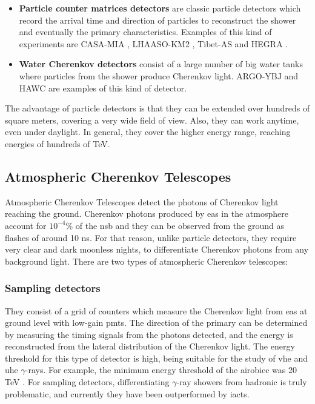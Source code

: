\documentclass[main.tex]{subfiles}
\begin{document}
\begin{itemize}
\item \textbf{Particle counter matrices detectors} are classic particle detectors which record the arrival time and direction of particles to reconstruct the shower and eventually the primary characteristics. Examples of this kind of experiments are CASA-MIA \cite{casamia}, LHAASO-KM2 \cite{2016LHAASO}, Tibet-AS \cite{1990TibetAs} and HEGRA \cite{FONSECA1992HEGRA}.

\item \textbf{Water Cherenkov detectors} consist of a large number of big water tanks where particles from the shower produce Cherenkov light. ARGO-YBJ \cite{2015Argo} and HAWC \cite{2014HAWC} are examples of this kind of detector.\\

\end{itemize}
The advantage of particle detectors is that they can be extended over hundreds of square meters, covering a very wide field of view. Also, they can work anytime, even under daylight. In general, they cover the higher energy range, reaching energies of hundreds of TeV.

\subsection{Atmospheric Cherenkov Telescopes}

Atmospheric Cherenkov Telescopes detect the photons of Cherenkov light reaching the ground. Cherenkov photons produced by \gls{eas} in the atmosphere account for $10^{-4}$\% of the \gls{nsb} and they can be observed from the ground as flashes of around 10 ns. For that reason, unlike particle detectors, they require very clear and dark moonless nights, to differentiate Cherenkov photons from any background light. There are two types of atmospheric Cherenkov telescopes:

\subsubsection{Sampling detectors}

They consist of a grid of counters which measure the Cherenkov light from \gls{eas} at ground level with low-gain \glspl{pmt}. The direction of the primary can be determined by measuring the timing signals from the photons detected, and the energy is reconstructed from the lateral distribution of the Cherenkov light. The energy threshold for this type of detector is high, being suitable for the study of \gls{vhe} and \gls{uhe} $\gamma$-rays. For example, the minimum energy threshold of the \gls{airobicc} was 20 TeV \cite{1996AIROBICC}. For sampling detectors, differentiating $\gamma$-ray showers from hadronic is truly problematic, and currently they have been outperformed by \glspl{iact}.
\end{document}

